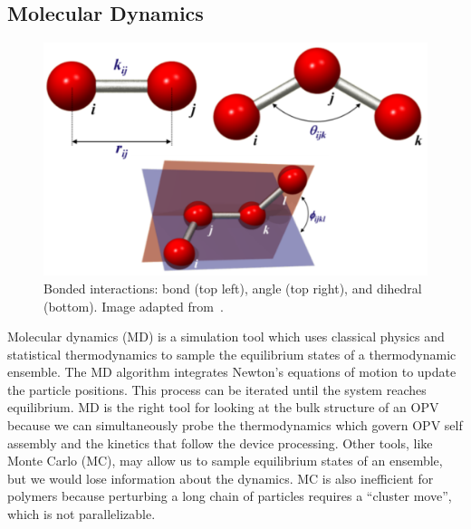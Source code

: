 \subsection*{Molecular Dynamics}

\begin{figure}
    \centering
    \includegraphics[width=\linewidth]{images/bondangledihedral.pdf}
    \caption{Bonded interactions: bond (top left), angle (top right), and dihedral (bottom). Image adapted from~\cite{punma}.}\label{bad}
\end{figure}
Molecular dynamics (MD) is a simulation tool which uses classical physics and statistical thermodynamics to sample the equilibrium states of a thermodynamic ensemble.
The MD algorithm integrates Newton's equations of motion to update the particle positions.
This process can be iterated until the system reaches equilibrium.
MD is the right tool for looking at the bulk structure of an OPV because we can simultaneously probe the thermodynamics which govern OPV self assembly and the kinetics that follow the device processing.
Other tools, like Monte Carlo (MC), may allow us to sample equilibrium states of an ensemble, but we would lose information about the dynamics.
MC is also inefficient for polymers because perturbing a long chain of particles requires a ``cluster move'', which is not parallelizable.

